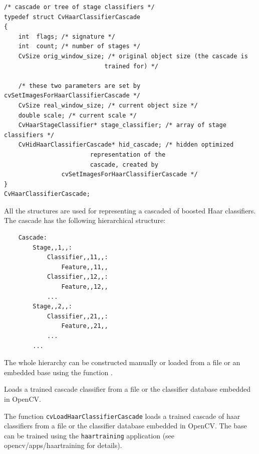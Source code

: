 \begin{lstlisting}
/* cascade or tree of stage classifiers */
typedef struct CvHaarClassifierCascade
{
    int  flags; /* signature */
    int  count; /* number of stages */
    CvSize orig_window_size; /* original object size (the cascade is 
							trained for) */

    /* these two parameters are set by cvSetImagesForHaarClassifierCascade */
    CvSize real_window_size; /* current object size */
    double scale; /* current scale */
    CvHaarStageClassifier* stage_classifier; /* array of stage classifiers */
    CvHidHaarClassifierCascade* hid_cascade; /* hidden optimized 
						representation of the 
						cascade, created by 
				cvSetImagesForHaarClassifierCascade */
}
CvHaarClassifierCascade;
\end{lstlisting}

All the structures are used for representing a cascaded of boosted Haar classifiers. The cascade has the following hierarchical structure:

\begin{verbatim}
    Cascade:
        Stage,,1,,:
            Classifier,,11,,:
                Feature,,11,,
            Classifier,,12,,:
                Feature,,12,,
            ...
        Stage,,2,,:
            Classifier,,21,,:
                Feature,,21,,
            ...
        ...
\end{verbatim}

The whole hierarchy can be constructed manually or loaded from a file or an embedded base using the function .


\label{LoadHaarClassifierCascade}

Loads a trained cascade classifier from a file or the classifier database embedded in OpenCV.


\begin{description}
\end{description}

The function \texttt{cvLoadHaarClassifierCascade} loads a trained cascade
of haar classifiers from a file or the classifier database embedded in
OpenCV. The base can be trained using the \texttt{haartraining} application
(see opencv/apps/haartraining for details).

